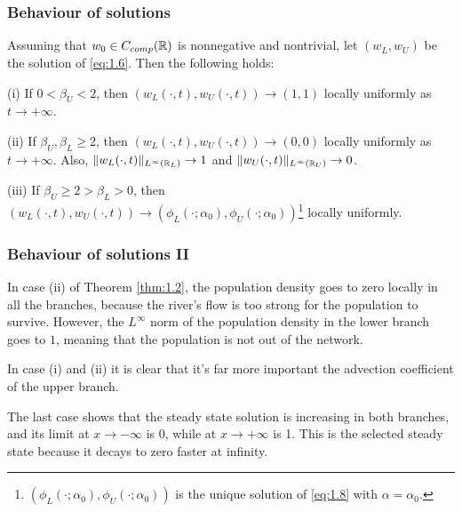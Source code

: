 \begin{frame}
    \frametitle{Behaviour of solutions}
    \begin{theorem}
        Assuming that \(w_0 \in C_{comp}(\mathbb{R})\) is nonnegative and nontrivial, let \((w_L, w_U)\) be the solution of \eqref{eq:1.6}. Then the following holds:

            (i) If \(0 < \beta_U < 2\), then \((w_L(\cdot, t), w_U(\cdot, t)) \to (1, 1)\) locally uniformly as \(t \to +\infty\).

            (ii) If \(\beta_U, \beta_L \geq 2\), then \((w_L(\cdot, t), w_U(\cdot, t)) \to (0, 0)\) locally uniformly as \(t \to +\infty\). Also, \(\lVert w_L(\cdot, t)\rVert_{L^\infty(\mathbb{R}_L)} \to 1\) and \(\lVert w_U(\cdot, t)\rVert_{L^\infty(\mathbb{R}_U)} \to 0\).

            (iii) If \(\beta_U \geq 2 > \beta_L > 0\), then \((w_L(\cdot, t), w_U(\cdot, t)) \to (\phi_L(\cdot; \alpha_0), \phi_U(\cdot; \alpha_0))\)\footnote{\((\phi_L(\cdot; \alpha_0), \phi_U(\cdot; \alpha_0))\) is the unique solution of \eqref{eq:1.8} with \(\alpha = \alpha_0\).} locally uniformly.
        \label{thm:1.2}
    \end{theorem}
\end{frame}


\begin{frame}
    \frametitle{Behaviour of solutions II}
    In case (ii) of Theorem \ref{thm:1.2}, the population density goes to zero locally in all the branches, because the river's flow is too strong for the population to survive. However, the \(L^\infty\) norm of the population density in the lower branch goes to \(1\), meaning that the population is not out of the network.

    In case (i) and (ii) it is clear that it's far more important the advection coefficient of the upper branch.

    The last case shows that the steady state solution is increasing in both branches, and its limit at \(x \to -\infty\) is 0, while at \(x \to +\infty\) is 1. This is the selected steady state because it decays to zero faster at infinity.
\end{frame}